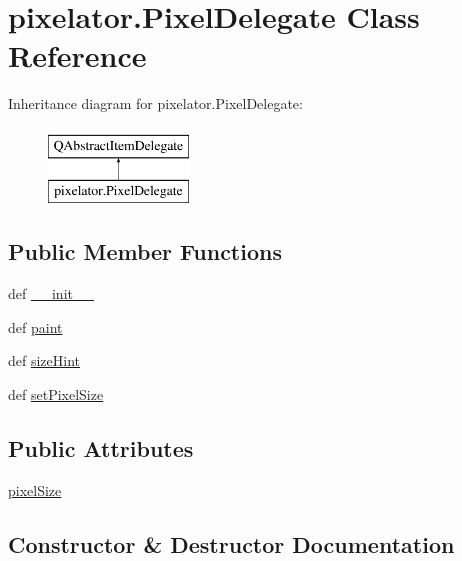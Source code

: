 \hypertarget{classpixelator_1_1PixelDelegate}{}\section{pixelator.\+Pixel\+Delegate Class Reference}
\label{classpixelator_1_1PixelDelegate}
Inheritance diagram for pixelator.\+Pixel\+Delegate\+:\begin{figure}[H]
\begin{center}
\leavevmode
\includegraphics[height=2.000000cm]{classpixelator_1_1PixelDelegate}
\end{center}
\end{figure}
\subsection*{Public Member Functions}
\begin{DoxyCompactItemize}
\item 
def \hyperlink{classpixelator_1_1PixelDelegate_aa9f64083a6079bcf9cb3e59f4161f37e}{\+\_\+\+\_\+init\+\_\+\+\_\+}
\item 
def \hyperlink{classpixelator_1_1PixelDelegate_a4a06724846b2c3eecfaa12e499b8844a}{paint}
\item 
def \hyperlink{classpixelator_1_1PixelDelegate_a0542dd7c42126b7405a924229f475c7e}{size\+Hint}
\item 
def \hyperlink{classpixelator_1_1PixelDelegate_abddde171db20dd4e3f9357e53e97ffd9}{set\+Pixel\+Size}
\end{DoxyCompactItemize}
\subsection*{Public Attributes}
\begin{DoxyCompactItemize}
\item 
\hyperlink{classpixelator_1_1PixelDelegate_a86a439380b20a57530fb8dacd7cff090}{pixel\+Size}
\end{DoxyCompactItemize}


\subsection{Constructor \& Destructor Documentation}
\hypertarget{classpixelator_1_1PixelDelegate_aa9f64083a6079bcf9cb3e59f4161f37e}{}
